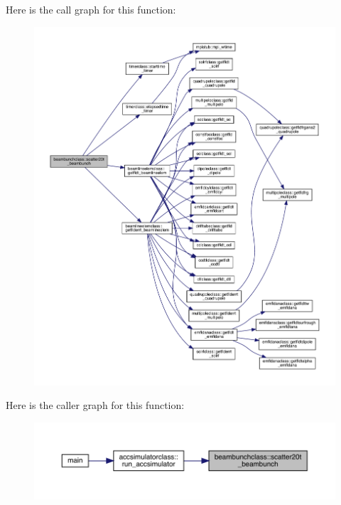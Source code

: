 Here is the call graph for this function\+:\nopagebreak
\begin{figure}[H]
\begin{center}
\leavevmode
\includegraphics[width=350pt]{namespacebeambunchclass_a950cb67b3fefb93f3d3a492fdef5b998_cgraph}
\end{center}
\end{figure}
Here is the caller graph for this function\+:\nopagebreak
\begin{figure}[H]
\begin{center}
\leavevmode
\includegraphics[width=350pt]{namespacebeambunchclass_a950cb67b3fefb93f3d3a492fdef5b998_icgraph}
\end{center}
\end{figure}
\mbox{\label{namespacebeambunchclass_a4353d7ca4b2e80df2e71209df5b0e36c}} 
